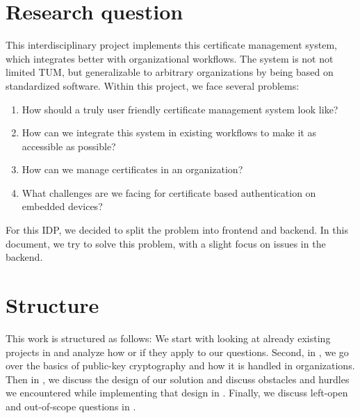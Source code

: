 \section*{Research question}
This interdisciplinary project implements this certificate management system, which integrates better with
organizational workflows.
The system is not not limited TUM, but generalizable to arbitrary organizations by being based on standardized software.
Within this project, we face several problems:
\begin{enumerate}
    \item How should a truly user friendly certificate management system look like?
    \item How can we integrate this system in existing workflows to make it as accessible as possible?
    \item How can we manage certificates in an organization?
    \item What challenges are we facing for certificate based authentication on embedded devices?
\end{enumerate}

For this IDP, we decided to split the problem into frontend and backend.
In this document, we try to solve this problem, with a slight focus on issues in the backend.

\section*{Structure}
This work is structured as follows:
We start with looking at already existing projects in  and analyze how or if they apply to our
questions.
Second, in , we go over the basics of public-key cryptography and how it is handled in
organizations.
Then in , we discuss the design of our solution and discuss obstacles and hurdles we encountered while
implementing that design in .
Finally, we discuss left-open and out-of-scope questions in .
